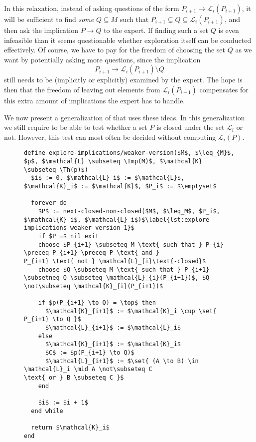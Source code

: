 In this relaxation, instead of asking questions of the form $P_{i+1} \to
\mathcal{L}_{i}(P_{i+1})$, it will be sufficient to find \emph{some} $Q \subseteq M$ such
that $P_{i+1} \subsetneq Q \subseteq \mathcal{L}_{i}(P_{i+1})$, and then ask the
implication $P \to Q$ to the expert.  If finding such a set $Q$ is even infeasible than it
seems questionable whether exploration itself can be conducted effectively.  Of course, we
have to pay for the freedom of choosing the set $Q$ as we want by potentially asking more
questions, since the implication
\begin{equation*}
  P_{i+1} \to \mathcal{L}_{i}(P_{i+1}) \setminus Q
\end{equation*}
still needs to be (implicitly or explicitly) examined by the expert.  The hope is then
that the freedom of leaving out elements from $\mathcal{L}_{i}(P_{i+1})$ compensates for
this extra amount of implications the expert has to handle.

We now present a generalization of  that uses these ideas.
In this generalization we still require to be able to test whether a set $P$ is closed
under the set $\mathcal{L}_{i}$ or not.  However, this test can most often be decided
without computing $\mathcal{L}_{i}(P)$.


\begin{figure}[tp]
  \begin{Algorithm}
    \label{alg:explore-implications-weaker-version}
    \hspace*{0cm}
\begin{lstlisting}
define explore-implications/weaker-version($M$, $\leq_{M}$, $p$, $\mathcal{L} \subseteq \Imp(M)$, $\mathcal{K} \subseteq \Th(p)$)
  $i$ := 0, $\mathcal{L}_i$ := $\mathcal{L}$, $\mathcal{K}_i$ := $\mathcal{K}$, $P_i$ := $\emptyset$

  forever do
    $P$ := next-closed-non-closed($M$, $\leq_M$, $P_i$, $\mathcal{K}_i$, $\mathcal{L}_i$)$\label{lst:explore-implications-weaker-version-1}$
    if $P =$ nil exit
    choose $P_{i+1} \subseteq M \text{ such that } P_{i} \preceq P_{i+1} \preceq P \text{ and }
P_{i+1} \text{ not } \mathcal{L}_{i}\text{-closed}$
    choose $Q \subseteq M \text{ such that } P_{i+1} \subsetneq Q \subseteq \mathcal{L}_{i}(P_{i+1})$, $Q \not\subseteq \mathcal{K}_{i}(P_{i+1})$

    if $p(P_{i+1} \to Q) = \top$ then
      $\mathcal{K}_{i+1}$ := $\mathcal{K}_i \cup \set{ P_{i+1} \to Q }$
      $\mathcal{L}_{i+1}$ := $\mathcal{L}_i$
    else
      $\mathcal{K}_{i+1}$ := $\mathcal{K}_i$
      $C$ := $p(P_{i+1} \to Q)$
      $\mathcal{L}_{i+1}$ := $\set{ (A \to B) \in \mathcal{L}_i \mid A \not\subseteq C
\text{ or } B \subseteq C }$
    end

    $i$ := $i + 1$
  end while

  return $\mathcal{K}_i$  
end
\end{lstlisting}
  \end{Algorithm}
\end{figure}

